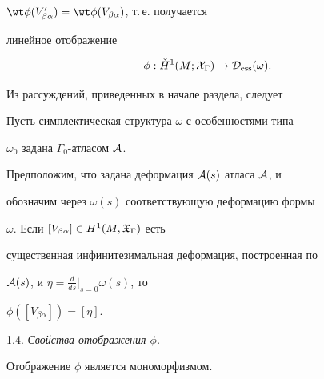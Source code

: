 $\wt\phi(V'_{\beta\alpha})=\wt\phi(V_{\beta\alpha})$, т.\,е. получается


линейное отображение


\begin{equation}\label{eq1}


\phi : \check H^1(M; {\cal X}_\Gamma) \to \cD_{\ess}(\omega).


\end{equation}





Из рассуждений, приведенных в начале раздела, следует





\begin{stat}


Пусть симплектическая структура $\omega$ с особенностями типа


$\omega_0$ задана $\Gamma_0$-атласом ${\cal A}$.


Предположим, что задана деформация ${\cal A}(s)$ атласа ${\cal A}$, и


обозначим через $\omega(s)$ соответствующую деформацию  формы


$\omega$. Если $[V_{\beta\alpha}] \in H^1(M, {\frak X}_\Gamma)$ есть


существенная инфинитезимальная деформация, построенная по


${\cal A}(s)$, и $\eta = \frac{d}{ds}\big|_{s=0}\omega(s)$, то


$\phi([V_{\beta\alpha}]) = [\eta]$.


\end{stat}





1.4. {\it Свойства отображения $\phi$.}\label{ss4}





\begin{stat} \label{st3}


Отображение $\phi$ является мономорфизмом.


\end{stat}





